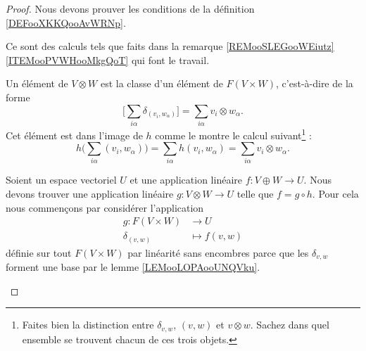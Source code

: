 \begin{proof}
	Nous devons prouver les conditions de la définition \ref{DEFooXKKQooAvWRNp}.

	\begin{subproof}

		Ce sont des calculs tels que faits dans la remarque \ref{REMooSLEGooWEiutz}\ref{ITEMooPVWHooMkgQoT} qui font le travail.


		Un élément de \( V\otimes W\) est la classe d'un élément de \( F(V\times W)\), c'est-à-dire de la forme
		\begin{equation}
			\big[ \sum_{i\alpha}\delta_{(v_i,w_{\alpha})} \big]=\sum_{i\alpha}v_i\otimes w_{\alpha}.
		\end{equation}
		Cet élément est dans l'image de \( h\) comme le montre le calcul suivant\footnote{Faites bien la distinction entre \( \delta_{v,w}\), \( (v,w)\) et \( v\otimes w\). Sachez dans quel ensemble se trouvent chacun de ces trois objets.} :
		\begin{equation}
			h\big( \sum_{i\alpha}(v_i,w_{\alpha}) \big)=\sum_{i\alpha}h(v_i,w_{\alpha})=\sum_{i\alpha}v_i\otimes w_{\alpha}.
		\end{equation}


		Soient un espace vectoriel \( U\) et une application linéaire \( f\colon V\oplus W\to U \). Nous devons trouver une application linéaire \( g\colon V\otimes W\to U\) telle que \( f=g\circ h\). Pour cela nous commençons par considérer l'application
		\begin{equation}
			\begin{aligned}
				g\colon F(V\times W) & \to U          \\
				\delta_{(v,w)}       & \mapsto f(v,w)
			\end{aligned}
		\end{equation}
		définie sur tout \( F(V\times W)\) par linéarité sans encombres parce que les \( \delta_{v,w}\) forment une base par le lemme \ref{LEMooLOPAooUNQVku}.


\end{subproof}
\end{proof}

